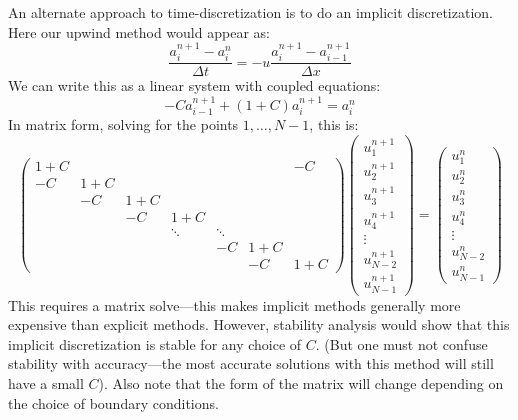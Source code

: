 An alternate approach to time-discretization is to do an implicit
discretization.  Here our upwind method would appear as:
\begin{equation}
\frac{a^{n+1}_i - a^n_i}{\Delta t} = -u \frac{a^{n+1}_i - a^{n+1}_{i-1}}{\Delta x}
\end{equation}
We can write this as a linear system with coupled equations:
\begin{equation}
-C a^{n+1}_{i-1} + (1 + C) a^{n+1}_i = a_i^n
\end{equation}
In matrix form, solving for the points $1, \ldots, N-1$, this is:
\begin{equation}
\renewcommand{\arraystretch}{1.5}
\left ( \begin{array}{ccccccc} 
1+C & & & & & & -C \\
-C  & 1+C &  \\
 &  -C & 1+C &  \\
 & & -C & 1+C &  \\
&&&\ddots&\ddots &\\
&&&&-C & 1+C & \\
&&&&& -C &1+C
\end{array}
\right )
%
\left ( \begin{array}{c}
u_1^{n+1} \\
u_2^{n+1} \\
u_3^{n+1} \\
u_4^{n+1} \\
\vdots \\
u_{N-2}^{n+1} \\
u_{N-1}^{n+1} 
\end{array}
\right )
=
\left ( \begin{array}{c}
u_1^{n} \\
u_2^{n} \\
u_3^{n} \\
u_4^{n} \\
\vdots \\
u_{N-2}^{n} \\
u_{N-1}^{n} 
\end{array}
\right )
\end{equation}
This requires a matrix solve---this makes implicit methods generally more
expensive than explicit methods.  However, stability analysis would show
that this implicit discretization is stable for any choice of $C$. (But
one must not confuse stability with accuracy---the most accurate solutions
with this method will still have a small $C$).  Also note that the form of 
the matrix will change depending on the choice of boundary conditions.

